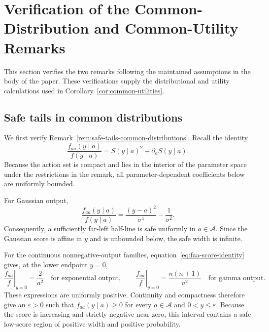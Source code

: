 \documentclass[12pt]{article}
\begin{document}
\section{Verification of the Common-Distribution and Common-Utility Remarks}
\label{sec:common-regularity-verification}

This section verifies the two remarks following the maintained assumptions in
the body of the paper.  These verifications supply the distributional and
utility calculations used in Corollary~\ref{cor:common-utilities}.

\subsection{Safe tails in common distributions}

We first verify Remark~\ref{rem:safe-tails-common-distributions}.  Recall the
identity
\begin{equation}
    \frac{f_{aa}(y\mid a)}{f(y\mid a)}
    =S(y\mid a)^2+\partial_a S(y\mid a).
    \label{eq:faa-score-identity}
\end{equation}
Because the action set is compact and lies in the interior of the parameter
space under the restrictions in the remark, all parameter-dependent
coefficients below are uniformly bounded.

For Gaussian output,
\[
 \frac{f_{aa}(y\mid a)}{f(y\mid a)}
 =\frac{(y-a)^2}{\sigma^4}-\frac1{\sigma^2}.
\]
Consequently, a sufficiently far-left half-line is safe uniformly in
$a\in\mathcal A$.  Since the Gaussian score is affine in $y$ and is
unbounded below, the safe width is infinite.

For the continuous nonnegative-output families, equation~\eqref{eq:faa-score-identity} gives, at the lower endpoint $y=0$,
\[
 \left.\frac{f_{aa}}f\right|_{y=0}
 =\frac{2}{a^2}\quad\text{for exponential output},
 \qquad
 \left.\frac{f_{aa}}f\right|_{y=0}
 =\frac{n(n+1)}{a^2}\quad\text{for gamma output}.
\]
These expressions are uniformly positive.  Continuity and compactness
therefore give an $\varepsilon>0$ such that $f_{aa}(y\mid a)\geq0$ for every
$a\in\mathcal A$ and $0<y\leq\varepsilon$.  Because the score is increasing
and strictly negative near zero, this interval contains a safe low-score
region of positive width and positive probability.
\end{document}
